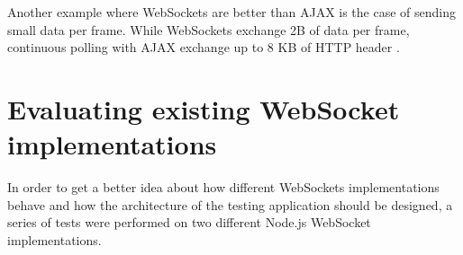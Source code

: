 \documentclass[conference]{IEEEtran}
\begin{document}
Another example where WebSockets are better than AJAX is the case of sending
small data per frame. While WebSockets exchange 2B of data per frame, continuous
polling with AJAX exchange up to 8 KB of HTTP header \cite{2009:Misc}.
\\

\section{Evaluating existing WebSocket implementations}
In order to get a better idea about how different WebSockets implementations
behave and how the architecture of the testing application should be designed, a
series of tests were performed on two different Node.js \cite{nodejs} WebSocket
implementations.
\\
\end{document}
